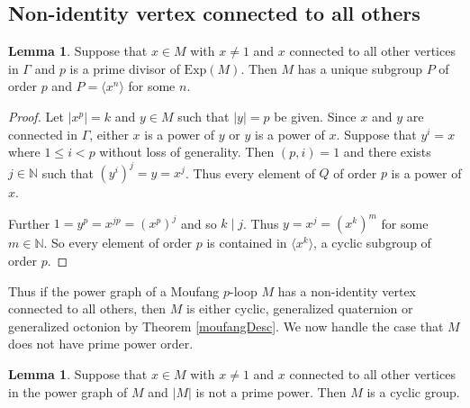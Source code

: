 \documentclass[12pt]{report}
\theoremstyle{definition}
\newtheorem{lem}[thm]{Lemma}
\newcommand{\Exp}{\text{Exp}}       %
\begin{document}
\subsection{Non-identity vertex connected to all others}\label{multi-vert}

\begin{lem}\label{connectedVertex}
  Suppose that $x\in M$ with $x\neq 1$ and $x$ connected to all other vertices in $\Gamma$ and $p$ is a
    prime divisor of $\Exp(M)$. Then $M$ has a unique subgroup $P$ of order $p$ and
    $P = \langle x^n \rangle$ for some $n$.
\end{lem}

\begin{proof}
  Let $|x^p| = k$ and $y\in M$ such that $|y| = p$ be given. Since $x$ and $y$ are connected in
    $\Gamma$, either $x$ is a power of $y$ or $y$ is a power of $x$. Suppose that $y^i = x$
    where $1\leq i < p$ without loss of generality. Then $(p, i) = 1$ and there exists
    $j\in\mathbb{N}$ such that $(y^i)^j = y = x^j$. Thus every element of $Q$ of order $p$
    is a power of $x$.

  Further $1 = y^p = x^{jp} = (x^p)^j$ and so $k\mid j$. Thus $y = x^j = (x^k)^m$ for some
    $m\in \mathbb{N}$. So every element of order $p$ is contained in $\langle x^k\rangle$,
    a cyclic subgroup of order $p$.
\end{proof}

Thus if the power graph of a Moufang $p$-loop $M$ has a non-identity vertex connected to all
  others, then $M$ is either cyclic, generalized quaternion or generalized octonion by Theorem
  \ref{moufangDesc}. We now handle the case that $M$ does not have prime power order.

\begin{lem}
  Suppose that $x\in M$ with $x\neq 1$ and $x$ connected to all other vertices in the power
    graph of $M$ and $|M|$ is not a prime power. Then $M$ is a cyclic group.
\end{lem}
\end{document}

